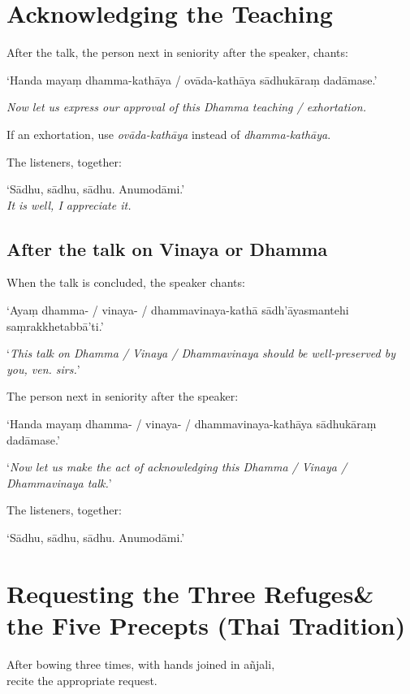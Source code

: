 
\section{Acknowledging the Teaching}

After the talk, the person next in seniority after the speaker, chants:

‘Handa mayaṃ dhamma-kathāya / ovāda-kathāya sādhukāraṃ dadāmase.’

\emph{Now let us express our approval of this Dhamma teaching / exhortation.}

If an exhortation, use \emph{ovāda-kathāya} instead of \emph{dhamma-kathāya}.

The listeners, together:

‘Sādhu, sādhu, sādhu. Anumodāmi.’\\
\emph{It is well, I appreciate it.}

\subsection{After the talk on Vinaya or Dhamma}

When the talk is concluded, the speaker chants:

‘Ayaṃ dhamma- / vinaya- / dhammavinaya-kathā sādh'āyasmantehi saṃrakkhetabbā'ti.’

‘\emph{This talk on Dhamma / Vinaya / Dhammavinaya should be well-preserved by you, ven. sirs.}’

The person next in seniority after the speaker:

‘Handa mayaṃ dhamma- / vinaya- / dhammavinaya-kathāya sādhukāraṃ dadāmase.’

‘\emph{Now let us make the act of acknowledging this Dhamma / Vinaya / Dhammavinaya talk.}’

The listeners, together:

‘Sādhu, sādhu, sādhu. Anumodāmi.’

\ifhandbookedition
\clearpage
\fi

\section[Three Refuges \& the Five Precepts]{Requesting the Three Refuges\newline \& the Five Precepts (Thai Tradition)}

\label{three-refuges}

\begin{instruction}
  After bowing three times, with hands joined in añjali,\\
  recite the appropriate request.
\end{instruction}


